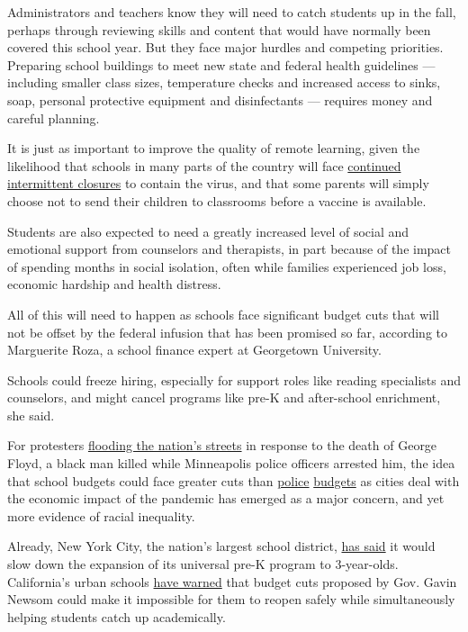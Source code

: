 Administrators and teachers know they will need to catch students up in
the fall, perhaps through reviewing skills and content that would have
normally been covered this school year. But they face major hurdles and
competing priorities. Preparing school buildings to meet new state and
federal health guidelines --- including smaller class sizes, temperature
checks and increased access to sinks, soap, personal protective
equipment and disinfectants --- requires money and careful planning.

It is just as important to improve the quality of remote learning, given
the likelihood that schools in many parts of the country will face
\href{https://www.nytimes3xbfgragh.onion/2020/04/28/us/coronavirus-schools-reopen.html}{continued
intermittent closures} to contain the virus, and that some parents will
simply choose not to send their children to classrooms before a vaccine
is available.

Students are also expected to need a greatly increased level of social
and emotional support from counselors and therapists, in part because of
the impact of spending months in social isolation, often while families
experienced job loss, economic hardship and health distress.

All of this will need to happen as schools face significant budget cuts
that will not be offset by the federal infusion that has been promised
so far, according to Marguerite Roza, a school finance expert at
Georgetown University.

Schools could freeze hiring, especially for support roles like reading
specialists and counselors, and might cancel programs like pre-K and
after-school enrichment, she said.

For protesters
\href{https://www.nytimes3xbfgragh.onion/2020/06/03/us/live-george-floyd-protests-today.html}{flooding
the nation's streets} in response to the death of George Floyd, a black
man killed while Minneapolis police officers arrested him, the idea that
school budgets could face greater cuts than
\href{https://www.inquirer.com/news/philadelphia/philadelphia-police-funding-increase-george-floyd-protests-20200602.html}{police}
\href{https://gothamist.com/news/nypd-defends-its-massive-budget-social-services-and-youth-programs-are-cut}{budgets}
as cities deal with the economic impact of the pandemic has emerged as a
major concern, and yet more evidence of racial inequality.

Already, New York City, the nation's largest school district,
\href{https://www.amny.com/education-2/carranza-warns-of-massive-nyc-public-school-cuts-in-face-of-horrific-budget/}{has
said} it would slow down the expansion of its universal pre-K program to
3-year-olds. California's urban schools
\href{https://www.documentcloud.org/documents/6894024-2020-21StateBud-Urban-Let051820.html}{have
warned} that budget cuts proposed by Gov. Gavin Newsom could make it
impossible for them to reopen safely while simultaneously helping
students catch up academically.


